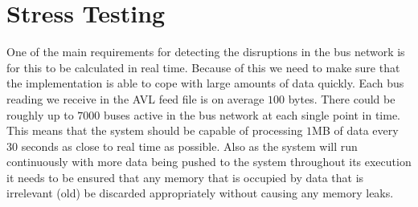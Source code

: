 \section{Stress Testing}
One of the main requirements for detecting the disruptions in the bus network is for this to be calculated in real time. Because of this we need to make sure that the implementation is able to cope with large amounts of data quickly. Each bus reading we receive in the AVL feed file is on average $100$ bytes. There could be roughly up to $7000$ buses active in the bus network at each single point in time. This means that the system should be capable of processing $1$MB of data every $30$ seconds as close to real time as possible. Also as the system will run continuously with more data being pushed to the system throughout its execution it needs to be ensured that any memory that is occupied by data that is irrelevant (old) be discarded appropriately without causing any memory leaks. 

